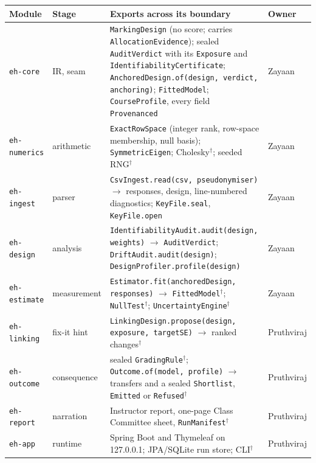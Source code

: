 \documentclass[10pt,a4paper]{article}
\begin{document}
\begin{center}\small
\begin{tabular}{|l|l|p{9.0cm}|l|}
\hline
\textbf{Module} & \textbf{Stage} & \textbf{Exports across its boundary} & \textbf{Owner} \\
\hline
\texttt{eh-core} & IR, seam & \raggedright \texttt{MarkingDesign} (no score; carries \texttt{AllocationEvidence}); sealed \texttt{AuditVerdict} with its \texttt{Exposure} and \texttt{IdentifiabilityCertificate}; \texttt{AnchoredDesign.of(design, verdict, anchoring)}; \texttt{FittedModel}; \texttt{CourseProfile}, every field \texttt{Provenanced} & Zayaan \\
\texttt{eh-numerics} & arithmetic & \raggedright \texttt{ExactRowSpace} (integer rank, row-space membership, null basis); \texttt{SymmetricEigen}; Cholesky$^\dagger$; seeded RNG$^\dagger$ & Zayaan \\
\texttt{eh-ingest} & parser & \raggedright \texttt{CsvIngest.read(csv, pseudonymiser)} $\rightarrow$ responses, design, line-numbered diagnostics; \texttt{KeyFile.seal}, \texttt{KeyFile.open} & Zayaan \\
\texttt{eh-design} & analysis & \raggedright \texttt{IdentifiabilityAudit.audit(design, weights)} $\rightarrow$ \texttt{AuditVerdict}; \texttt{DriftAudit.audit(design)}; \texttt{DesignProfiler.profile(design)} & Zayaan \\
\texttt{eh-estimate} & measurement & \raggedright \texttt{Estimator.fit(anchoredDesign, responses)} $\rightarrow$ \texttt{FittedModel}$^\dagger$; \texttt{NullTest}$^\dagger$; \texttt{UncertaintyEngine}$^\dagger$ & Zayaan \\
\texttt{eh-linking} & fix-it hint & \raggedright \texttt{LinkingDesign.propose(design, exposure, targetSE)} $\rightarrow$ ranked changes$^\dagger$ & Pruthviraj \\
\texttt{eh-outcome} & consequence & \raggedright sealed \texttt{GradingRule}$^\dagger$; \texttt{Outcome.of(model, profile)} $\rightarrow$ transfers and a sealed \texttt{Shortlist}, \texttt{Emitted} or \texttt{Refused}$^\dagger$ & Pruthviraj \\
\texttt{eh-report} & narration & \raggedright Instructor report, one-page Class Committee sheet, \texttt{RunManifest}$^\dagger$ & Pruthviraj \\
\texttt{eh-app} & runtime & \raggedright Spring Boot and Thymeleaf on 127.0.0.1; JPA/SQLite run store; CLI$^\dagger$ & Pruthviraj \\
\hline
\end{tabular}
\end{center}
\end{document}

